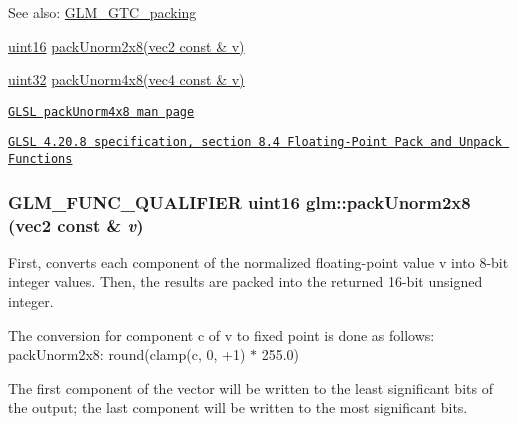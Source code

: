 \begin{Desc}
\item[See also:]\hyperlink{group__gtc__packing}{GLM\_\-GTC\_\-packing} 

\hyperlink{group__gtc__type__precision_gd8c2939e1fdd8e5828b31d95c52255d5}{uint16} \hyperlink{group__gtc__packing_g833288fc0d4a79f19d0db75a6843bfe6}{packUnorm2x8(vec2 const \& v)} 

\hyperlink{group__gtc__type__precision_g202b6a53c105fcb7e531f9b443518451}{uint32} \hyperlink{group__core__func__packing_g834ee9a9e73dcb0a7c1fc88143f3edb8}{packUnorm4x8(vec4 const \& v)} 

\href{http://www.opengl.org/sdk/docs/manglsl/xhtml/packUnorm4x8.xml}{\tt GLSL packUnorm4x8 man page} 

\href{http://www.opengl.org/registry/doc/GLSLangSpec.4.20.8.pdf}{\tt GLSL 4.20.8 specification, section 8.4 Floating-Point Pack and Unpack Functions} \end{Desc}
\hypertarget{group__gtc__packing_g833288fc0d4a79f19d0db75a6843bfe6}{
\subsubsection[packUnorm2x8]{\setlength{\rightskip}{0pt plus 5cm}GLM\_\-FUNC\_\-QUALIFIER uint16 glm::packUnorm2x8 (vec2 const \& {\em v})}}
\label{group__gtc__packing_g833288fc0d4a79f19d0db75a6843bfe6}


First, converts each component of the normalized floating-point value v into 8-bit integer values. Then, the results are packed into the returned 16-bit unsigned integer.

The conversion for component c of v to fixed point is done as follows: packUnorm2x8: round(clamp(c, 0, +1) $\ast$ 255.0)

The first component of the vector will be written to the least significant bits of the output; the last component will be written to the most significant bits.

